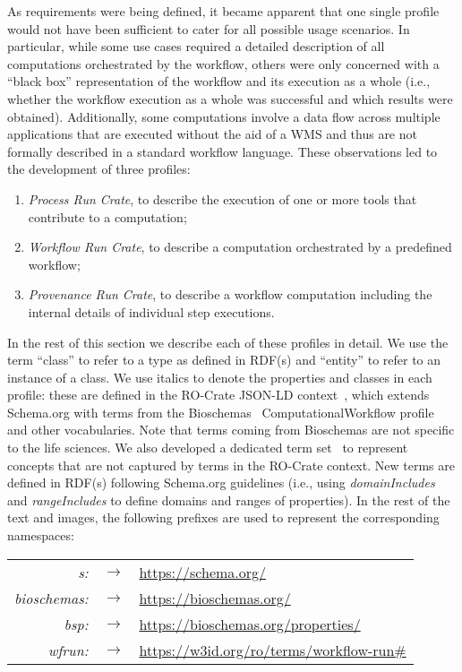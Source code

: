 \documentclass[10pt,letterpaper]{article}
\begin{document}
As requirements were being defined, it became apparent that one single profile would not have been sufficient to cater for all possible usage scenarios.
In particular, while some use cases required a detailed description of all computations orchestrated by the workflow, others were only concerned with a ``black box'' representation of the workflow and its execution as a whole (i.e., whether the workflow execution as a whole was successful and which results were obtained).
Additionally, some computations involve a data flow across multiple applications that are executed without the aid of a WMS and thus are not formally described in a standard workflow language.
These observations led to the development of three profiles:
\begin{enumerate}
    \item \textit{Process Run Crate},
 to describe the execution of one or more tools that contribute to a computation;
    \item \textit{Workflow Run Crate},
 to describe a computation orchestrated by a predefined workflow; 
    \item \textit{Provenance Run Crate},
 to describe a workflow computation including the internal details of individual step executions.
\end{enumerate} 

In the rest of this section we describe each of these profiles in detail. We use the term ``class'' to refer to a type as defined in RDF(s) and ``entity'' to refer to an instance of a class. We use italics to denote the properties and classes in each profile: these are defined in the RO-Crate JSON-LD context~\cite{roc-context}, which extends Schema.org with terms from the Bioschemas~\cite{Gray 2017} ComputationalWorkflow profile~\cite{computational-workflow-profile} and other vocabularies.
Note that terms coming from Bioschemas are not specific to the life sciences.
We also developed a dedicated term set~\cite{wrroc-terms} to represent concepts that are not captured by terms in the RO-Crate context. New terms are defined in RDF(s) following Schema.org guidelines (i.e., using \emph{domainIncludes} and \emph{rangeIncludes} to define domains and ranges of properties). 
In the rest of the text and images, the following prefixes are used to represent the corresponding namespaces:
\begin{tabular}{rcl}
\emph{s:}         & $\rightarrow$ & \url{https://schema.org/} \\
\emph{bioschemas:}& $\rightarrow$ & \url{https://bioschemas.org/} \\
\emph{bsp:}       & $\rightarrow$ & \url{https://bioschemas.org/properties/} \\
\emph{wfrun:}     & $\rightarrow$ & \url{https://w3id.org/ro/terms/workflow-run\#} \\
\end{tabular}
\end{document}
